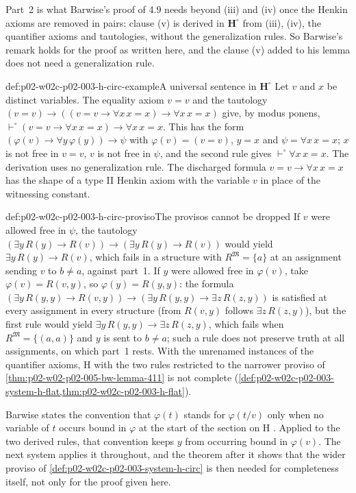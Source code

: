 Part~2 is what Barwise's proof of 4.9 needs beyond (iii) and (iv) once
the Henkin axioms are removed in pairs: clause (v) is derived in
\(\mathbf H^{\circ}\) from (iii), (iv), the quantifier axioms and
tautologies, without the generalization rules.  So Barwise's remark holds
for the proof as written here, and the clause (v) added to his lemma does
not need a generalization rule.

\begin{hbexample}{def:p02-w02c-p02-003-h-circ-example}{A universal sentence in \(\mathbf H^{\circ}\)}
Let \(v\) and \(x\) be distinct variables.  The equality axiom \(v=v\) and
the tautology \((v=v)\to((v=v\to\forall x\,x=x)\to\forall x\,x=x)\) give,
by modus ponens, \(\vdash^{\circ}(v=v\to\forall x\,x=x)\to\forall x\,x=x\).
This has the form \((\varphi(v)\to\forall y\,\varphi(y))\to\psi\) with
\(\varphi(v)=(v=v)\), \(y=x\) and \(\psi=\forall x\,x=x\); \(x\) is not free
in \(v=v\), \(v\) is not free in \(\psi\), and the second rule gives
\(\vdash^{\circ}\forall x\,x=x\).  The derivation uses no generalization
rule.  The discharged formula \(v=v\to\forall x\,x=x\) has the shape of a
type II Henkin axiom with the variable \(v\) in place of the witnessing
constant.
\end{hbexample}

\begin{hbwarning}{def:p02-w02c-p02-003-h-circ-proviso}{The provisos cannot be dropped}
If \(v\) were allowed free in \(\psi\), the tautology
\((\exists y\,R(y)\to R(v))\to(\exists y\,R(y)\to R(v))\) would yield
\(\exists y\,R(y)\to R(v)\), which fails in a structure with
\(R^{\mathfrak M}=\{a\}\) at an assignment sending \(v\) to \(b\neq a\),
against part~1.  If \(y\) were allowed free in \(\varphi(v)\), take
\(\varphi(v)=R(v,y)\), so \(\varphi(y)=R(y,y)\): the formula
\((\exists y\,R(y,y)\to R(v,y))\to(\exists y\,R(y,y)\to\exists z\,R(z,y))\)
is satisfied at every assignment in every structure (from \(R(v,y)\)
follows \(\exists z\,R(z,y)\)), but the first rule would yield
\(\exists y\,R(y,y)\to\exists z\,R(z,y)\), which fails when
\(R^{\mathfrak M}=\{(a,a)\}\) and \(y\) is sent to \(b\neq a\); such a rule
does not preserve truth at all assignments, on which part~1 rests.
With the unrenamed instances of the quantifier axioms, H with the two
rules restricted to the narrower proviso of
\cref{thm:p02-w02-p02-005-bw-lemma-411} is not complete
(\cref{def:p02-w02c-p02-003-system-h-flat,thm:p02-w02c-p02-003-h-flat}).
\end{hbwarning}

Barwise states the convention that \(\varphi(t)\) stands for
\(\varphi(t/v)\) only when no variable of \(t\) occurs bound in
\(\varphi\) at the start of the section on H
\cite[ch.~A.1, \S4, p.~34]{Barwise1977FirstOrder}.  Applied to the two
derived rules, that convention keeps \(y\) from occurring bound in
\(\varphi(v)\).  The next system applies it throughout, and the theorem
after it shows that the wider proviso of
\cref{def:p02-w02c-p02-003-system-h-circ} is then needed for completeness
itself, not only for the proof given here.

